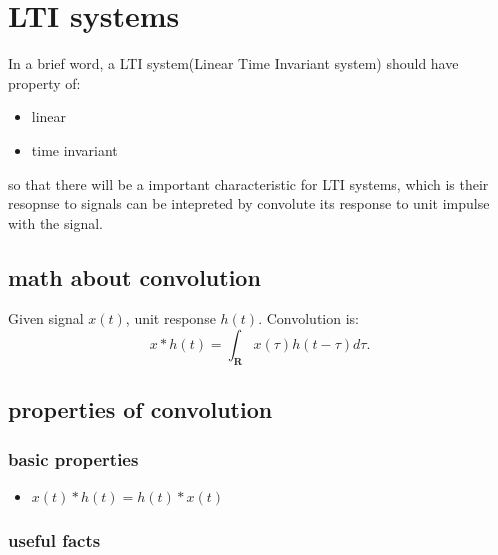 \documentclass[11pt]{article}
\date{\today}
\title{}
\begin{document}
\tableofcontents

\section{LTI systems}
\label{sec:orgf7943c0}

In a brief word, a LTI system(Linear Time Invariant system) should have property of:
\begin{itemize}
\item linear
\item time invariant
\end{itemize}
so that there will be a important characteristic for LTI systems, which is their resopnse to signals can be intepreted by convolute its response to unit impulse with the signal.
\subsection{math about convolution}
\label{sec:org76f310d}

Given signal $x(t)$, unit response $h(t)$. Convolution is: 
\begin{equation}
  x * h(t) = \int_{\mathbf{R}}x(\tau)h(t-\tau)d\tau.
\end{equation}
\subsection{properties of convolution}
\label{sec:org31cfd2b}
\subsubsection{basic properties}
\label{sec:orgd9c9dbb}

\begin{itemize}
\item \(x(t)*h(t) = h(t)*x(t)\)
\end{itemize}
\subsubsection{useful facts}
\label{sec:orgcb422ca}
\end{document}
